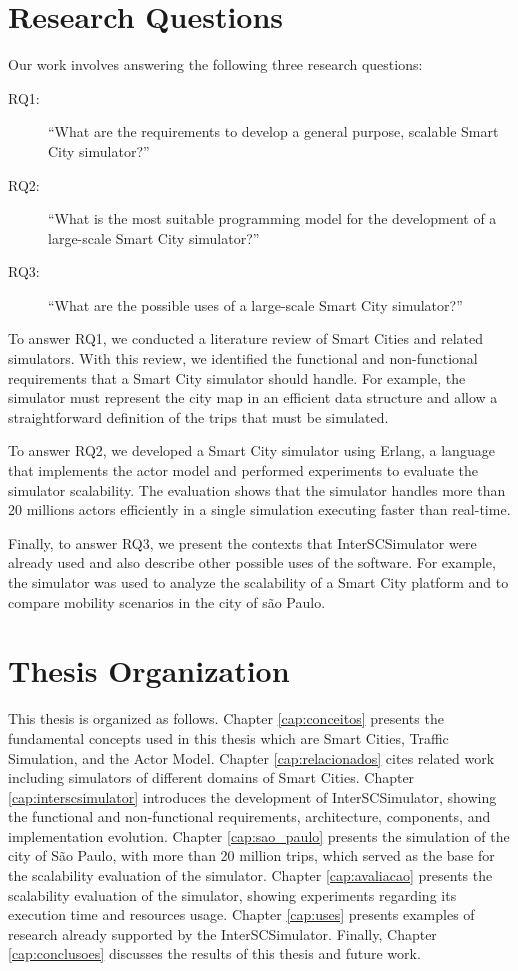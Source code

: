 \section{Research Questions}

Our work involves answering the following three research questions:

\begin{description}
\item[RQ1:] ``What are the requirements to develop a general purpose, scalable Smart City simulator?''
\item[RQ2:] ``What is the most suitable programming model for the development of a large-scale Smart City simulator?''
\item[RQ3:] ``What are the possible uses of a large-scale Smart City simulator?''
\end{description}

To answer RQ1, we conducted a literature review of Smart Cities and related simulators. With this review, we identified the functional and non-functional requirements that a Smart City simulator should handle. For example, the simulator must represent the city map in an efficient data structure and allow a straightforward definition of the trips that must be simulated. 

To answer RQ2, we developed a Smart City simulator using Erlang, a language that implements the actor model and performed experiments to evaluate the simulator scalability. The evaluation shows that the simulator handles more than 20  millions actors efficiently in a single simulation executing faster than real-time.

Finally, to answer RQ3, we present the contexts that InterSCSimulator were already used and also describe other possible uses of the software. For example, the simulator was used to analyze the scalability of a Smart City platform and to compare mobility scenarios in the city of s\~ao Paulo.

\section{Thesis Organization}
\label{sec:organizacao_trabalho}

This thesis is organized as follows. Chapter \ref{cap:conceitos} presents the fundamental concepts used in this thesis which are Smart Cities, Traffic Simulation, and the Actor Model. Chapter \ref{cap:relacionados} cites related work including simulators of different domains of Smart Cities. Chapter \ref{cap:interscsimulator} introduces the development of InterSCSimulator, showing the functional and non-functional requirements, architecture, components, and implementation evolution. Chapter \ref{cap:sao_paulo} presents the simulation of the city of S\~ao Paulo, with more than 20 million trips, which served as the base for the scalability evaluation of the simulator. Chapter \ref{cap:avaliacao} presents the scalability evaluation of the simulator, showing experiments regarding its execution time and resources usage. Chapter \ref{cap:uses} presents examples of research already supported by the InterSCSimulator. Finally, Chapter \ref{cap:conclusoes} discusses the results of this thesis and future work.